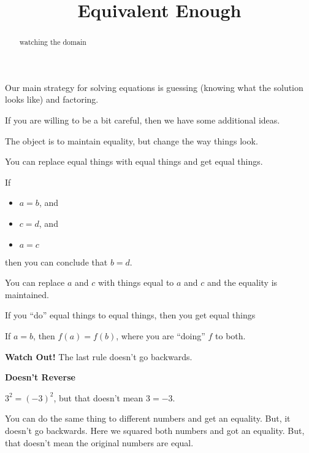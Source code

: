 \documentclass{ximera}
\title{Equivalent Enough}
\begin{document}
\begin{abstract}
watching the domain
\end{abstract}
\maketitle





Our main strategy for solving equations is guessing (knowing what the solution looks like) and factoring.




If you are willing to be a bit careful, then we have some additional ideas.

The object is to maintain equality, but change the way things look.



\begin{observation}


You can replace equal things with equal things and get equal things.


If 
\begin{itemize}
\item $a=b$, and
\item $c=d$, and
\item $a=c$
\end{itemize}
then you can conclude that $b=d$.

You can replace $a$ and $c$ with things equal to $a$ and $c$ and the equality is maintained.


\end{observation}





\begin{observation}


If you ``do'' equal things to equal things, then you get equal things


If $a=b$, then $f(a) = f(b)$, where you are ``doing'' $f$ to both.



\end{observation}




\textbf{\textcolor{red!80!black}{Watch Out!}} The last rule doesn't go backwards.




\begin{warning}  \textbf{\textcolor{red!80!black}{Doesn't Reverse}}  



$3^2 = (-3)^2$, but that doesn't mean $3=-3$.


You can do the same thing to different numbers and get an equality.  But, it doesn't go backwards.  Here we squared both numbers and got an equality.  But, that doesn't mean the original numbers are equal.


\end{warning}
\end{document}
